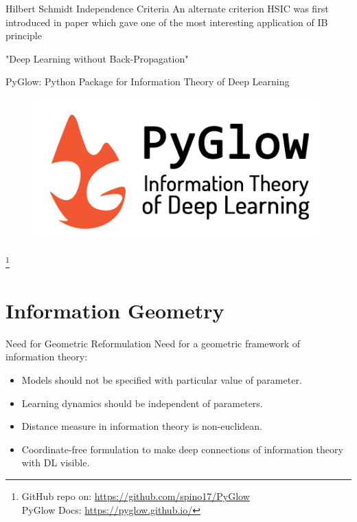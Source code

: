 \documentclass{beamer}
\begin{document}
\begin{frame}{Hilbert Schmidt Independence Criteria}
    An alternate criterion HSIC was first introduced in paper   which gave one of the most interesting application of IB principle \\
    \vspace{10mm}
    \Large{\centerline{"Deep Learning without Back-Propagation"}}
    
\end{frame}

\begin{frame}{PyGlow: Python Package for Information Theory of Deep Learning}
\begin{figure}[H]
\centering
\includegraphics[width=110mm]{Images/PyGlow_complete_logo.jpg}
\end{figure}
\footnote{GitHub repo on: \url{https://github.com/spino17/PyGlow} \\
PyGlow Docs: \url{https://pyglow.github.io/}}
\end{frame}

\section{Information Geometry}
\begin{frame}{Need for Geometric Reformulation}
Need for a geometric framework of information theory:
    \begin{itemize}
        \item Models should not be specified with particular value of parameter.
        \item Learning dynamics should be independent of parameters.
        \item Distance measure in information theory is non-euclidean.
        \item Coordinate-free formulation to make deep connections of information theory with DL visible.
    \end{itemize}
\end{frame}
\end{document}
